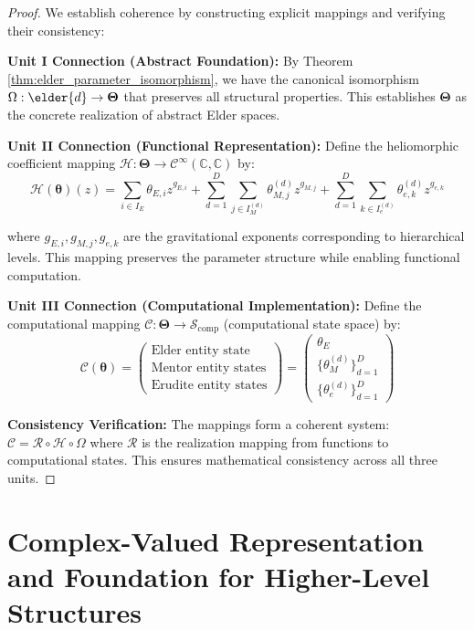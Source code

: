 \begin{proof}
We establish coherence by constructing explicit mappings and verifying their consistency:

\textbf{Unit I Connection (Abstract Foundation):}
By Theorem \ref{thm:elder_parameter_isomorphism}, we have the canonical isomorphism $\Omega: \elder{d} \rightarrow \boldsymbol{\Theta}$ that preserves all structural properties. This establishes $\boldsymbol{\Theta}$ as the concrete realization of abstract Elder spaces.

\textbf{Unit II Connection (Functional Representation):}  
Define the heliomorphic coefficient mapping $\mathcal{H}: \boldsymbol{\Theta} \rightarrow \mathcal{C}^{\infty}(\mathbb{C}, \mathbb{C})$ by:
$$\mathcal{H}(\boldsymbol{\theta})(z) = \sum_{i \in I_E} \theta_{E,i} z^{g_{E,i}} + \sum_{d=1}^D \sum_{j \in I_M^{(d)}} \theta_{M,j}^{(d)} z^{g_{M,j}} + \sum_{d=1}^D \sum_{k \in I_e^{(d)}} \theta_{e,k}^{(d)} z^{g_{e,k}}$$

where $g_{E,i}, g_{M,j}, g_{e,k}$ are the gravitational exponents corresponding to hierarchical levels. This mapping preserves the parameter structure while enabling functional computation.

\textbf{Unit III Connection (Computational Implementation):}
Define the computational mapping $\mathcal{C}: \boldsymbol{\Theta} \rightarrow \mathcal{S}_{\text{comp}}$ (computational state space) by:
$$\mathcal{C}(\boldsymbol{\theta}) = \left(\begin{array}{c} 
\text{Elder entity state} \\
\text{Mentor entity states} \\
\text{Erudite entity states}
\end{array}\right) = \left(\begin{array}{c}
\theta_E \\
\{\theta_M^{(d)}\}_{d=1}^D \\
\{\theta_e^{(d)}\}_{d=1}^D
\end{array}\right)$$

\textbf{Consistency Verification:}
The mappings form a coherent system: $\mathcal{C} = \mathcal{R} \circ \mathcal{H} \circ \Omega$ where $\mathcal{R}$ is the realization mapping from functions to computational states. This ensures mathematical consistency across all three units.
\end{proof}

\section{Complex-Valued Representation and Foundation for Higher-Level Structures}

